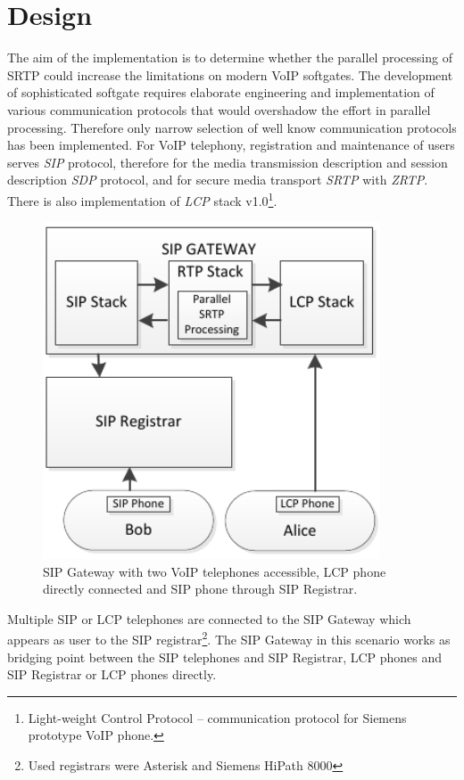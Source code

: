 \chapter{Design}\label{chapter:design}%
The aim of the implementation is to determine whether the parallel processing
of SRTP could increase the limitations on modern VoIP softgates. The development
of sophisticated softgate requires elaborate engineering and implementation
of various communication protocols that would overshadow the effort in parallel
processing. Therefore only narrow selection of well know communication protocols
has been implemented. For VoIP telephony, registration and maintenance of users
serves \textit{SIP} protocol, therefore for the media transmission description
and session description \textit{SDP} protocol, and for secure media transport 
\textit{SRTP} with \textit{ZRTP}. There is also implementation of \textit{LCP} 
stack v1.0\footnote{ Light-weight Control Protocol -- communication protocol for
Siemens prototype VoIP phone.}.



\begin{figure}[H]
\centering
\includegraphics[width=10cm]{fig/scenario1.pdf}
\caption{SIP Gateway with two VoIP telephones accessible, LCP phone directly 
connected and SIP phone through SIP Registrar.}
\label{oclpm}
\end{figure}

Multiple SIP or LCP telephones are connected to the SIP Gateway which appears as
user to the SIP registrar\footnote{ Used registrars were Asterisk and Siemens 
HiPath 8000}. The SIP Gateway in this scenario works as bridging point between 
the SIP telephones and SIP Registrar, LCP phones and SIP Registrar or LCP phones
directly.

